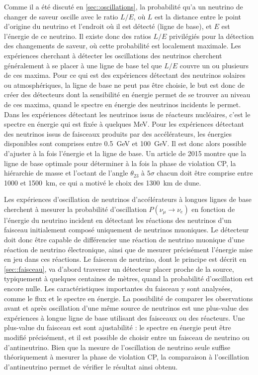             Comme il a été discuté en \autoref{sec::oscillations}, la probabilité qu'a un neutrino de changer de saveur oscille avec le ratio $L/E$, où $L$ est la distance entre le point d'origine du neutrino et l'endroit où il est détecté (ligne de base), et $E$ est l'énergie de ce neutrino. Il existe donc des ratios $L/E$ privilégiés pour la détection des changements de saveur, où cette probabilité est localement maximale. Les expériences cherchant à détecter les oscillations des neutrinos cherchent généralement à se placer à une ligne de base tel que $L/E$ couvre un ou plusieurs de ces maxima. Pour ce qui est des expériences détectant des neutrinos solaires ou atmosphériques, la ligne de base ne peut pas être choisie, le but est donc de créer des détecteurs dont la sensibilité en énergie permet de se trouver au niveau de ces maxima, quand le spectre en énergie des neutrinos incidents le permet. Dans les expériences détectant les neutrinos issus de réacteurs nucléaires, c'est le spectre en énergie qui est fixée à quelques \si{\mega\electronvolt}. Pour les expériences détectant des neutrinos issus de faisceaux produits par des accélérateurs, les énergies disponibles sont comprises entre \SI{0.5}{\giga\electronvolt} et \SI{100}{\giga\electronvolt}. Il est donc alors possible d'ajuster à la fois l'énergie et la ligne de base. Un article de 2015\cite{Bass2015} montre que la ligne de base optimale pour déterminer à la fois la phase de violation CP, la hiérarchie de masse et l'octant de l'angle $\theta_{23}$ à $5\sigma$ chacun doit être comprise entre 1000 et \SI{1500}{\kilo\meter}, ce qui a motivé le choix des \SI{1300}{\kilo\meter} de \gls{dune}.
            
            Les expériences d'oscillation de neutrinos d'accélérateurs à longues lignes de base cherchent à mesurer la probabilité d'oscillation $P(\nu_{\mu}\to \nu_e)$ en fonction de l'énergie du neutrino incident en détectant les réactions des neutrinos d'un faisceau initialement composé uniquement de neutrinos muoniques. Le détecteur doit donc être capable de différencier une réaction de neutrino muonique d'une réaction de neutrino électronique, ainsi que de mesurer précisément l'énergie mise en jeu dans ces réactions. Le faisceau de neutrino, dont le principe est décrit en \autoref{sec::faisceau}, va d'abord traverser un détecteur placer proche de la source, typiquement à quelques centaines de mètres, quand la probabilité d'oscillation est encore nulle. Les caractéristiques importantes du faisceau y sont analysées, comme le flux et le spectre en énergie. La possibilité de comparer les observations avant et après oscillation d'une même source de neutrinos est une plus-value des expériences à longue ligne de base utilisant des faisceaux ou des réacteurs. Une plus-value du faisceau est sont ajustabilité : le spectre en énergie peut être modifié précisément, et il est possible de choisir entre un faisceau de neutrino ou d'antineutrino. Bien que la mesure de l'oscillation de neutrino seule suffise théoriquement à mesurer la phase de violation CP, la comparaison à l'oscillation d'antineutrino permet de vérifier le résultat ainsi obtenu.
            
